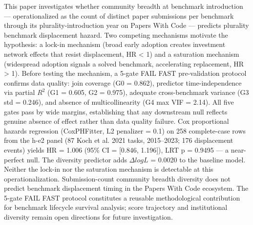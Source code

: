 
This paper investigates whether community breadth at benchmark introduction --- operationalized as the count of distinct paper submissions per benchmark through its plurality-introduction year on Papers With Code --- predicts plurality benchmark displacement hazard. Two competing mechanisms motivate the hypothesis: a lock-in mechanism (broad early adoption creates investment network effects that resist displacement, HR < 1) and a saturation mechanism (widespread adoption signals a solved benchmark, accelerating replacement, HR > 1). Before testing the mechanism, a 5-gate FAIL FAST pre-validation protocol confirms data quality: join coverage (G0 = 0.862), predictor time-independence via partial $R^2$ (G1 = 0.605, G2 = 0.975), adequate cross-benchmark variance (G3 std = 0.246), and absence of multicollinearity (G4 max VIF = 2.14). All five gates pass by wide margins, establishing that any downstream null reflects genuine absence of effect rather than data quality failure. Cox proportional hazards regression (CoxPHFitter, L2 penalizer = 0.1) on 258 complete-case rows from the h-e2 panel (87 Koch et al. 2021 tasks, 2015--2023; 176 displacement events) yields HR = 1.006 (95\% CI = [0.846, 1.196]), LRT p = 0.9495 --- a near-perfect null. The diversity predictor adds $\Delta logL$ = 0.0020 to the baseline model. Neither the lock-in nor the saturation mechanism is detectable at this operationalization. Submission-count community breadth diversity does not predict benchmark displacement timing in the Papers With Code ecosystem. The 5-gate FAIL FAST protocol constitutes a reusable methodological contribution for benchmark lifecycle survival analysis; score trajectory and institutional diversity remain open directions for future investigation.

